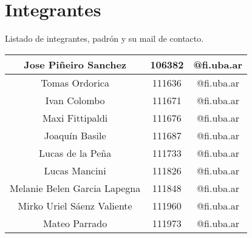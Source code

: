 \section{Integrantes}

Listado de integrantes, padrón y su mail de contacto.
\begin{center}
\begin{tabular}{|c|c|c|}

   \hline\hline
   Jose Piñeiro Sanchez  & 106382 & @fi.uba.ar\\
   \hline
   Tomas Ordorica  & 111636 & @fi.uba.ar\\
   \hline
   Ivan Colombo  & 111671 & @fi.uba.ar\\
   \hline
   Maxi Fittipaldi  & 111676 & @fi.uba.ar\\
   \hline
   Joaquín Basile  & 111687 & @fi.uba.ar\\
   \hline
   Lucas de la Peña  & 111733 & @fi.uba.ar\\
   \hline
   Lucas Mancini  & 111826 & @fi.uba.ar\\
   \hline
   Melanie Belen Garcia Lapegna  & 111848 & @fi.uba.ar\\
   \hline
   Mirko Uriel Sáenz Valiente  & 111960 & @fi.uba.ar\\
   \hline
   Mateo Parrado  & 111973 & @fi.uba.ar\\
   \hline\hline
\end{tabular}
\end{center}
